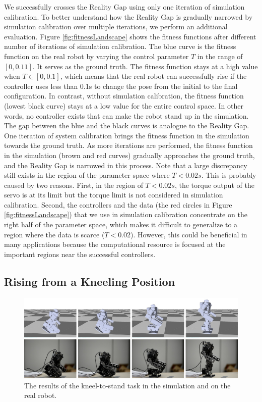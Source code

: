 We successfully crosses the Reality Gap using only one iteration of simulation calibration. To better understand how the Reality Gap is gradually narrowed by simulation calibration over multiple iterations, we perform an additional evaluation. Figure \ref{fig:fitnessLandscape} shows the fitness functions after different number of iterations of simulation calibration. The blue curve is the fitness function on the real robot by varying the control parameter $T$ in the range of $[0, 0.11]$. It serves as the ground truth. The fitness function stays at a high value when $T\in[0, 0.1]$, which means that the real robot can successfully rise if the controller uses less than 0.1s to change the pose from the initial to the final configuration. In contrast, without simulation calibration, the fitness function (lowest black curve) stays at a low value for the entire control space. In other words, no controller exists that can make the robot stand up in the simulation. The gap between the blue and the black curves is analogue to the Reality Gap. One iteration of system calibration brings the fitness function in the simulation towards the ground truth. As more iterations are performed, the fitness function in the simulation (brown and red curves) gradually approaches the ground truth, and the Reality Gap is narrowed in this process. Note that a large discrepancy still exists in the region of the parameter space where $T<0.02s$. This is probably caused by two reasons. First, in the region of $T<0.02s$, the torque output of the servo is at its limit but the torque limit is not considered in simulation calibration. Second, the controllers and the data (the red circles in Figure \ref{fig:fitnessLandscape}) that we use in simulation calibration concentrate on the right half of the parameter space, which makes it difficult to generalize to a region where the data is scarce ($T<0.02$). However, this could be beneficial in many applications because the computational resource is focused at the important regions near the successful controllers.

\subsection{Rising from a Kneeling Position}

\begin{figure}[!t]
  \centering
  \includegraphics[width=\textwidth]{figures/kneel2Stand}
  \caption{The results of the kneel-to-stand task in the simulation and on the real robot.}
  \label{fig:kneel2Stand}
\end{figure}

